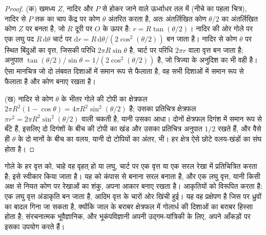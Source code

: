 \begin{proof}
(क) खमध्य $Z$, नादिर और $P$ से होकर जाने वाले ऊर्ध्वाधर तल में
(नीचे का पहला चित्र), नादिर से $P$ तक का चाप
केंद्र पर कोण $\theta$ अंतरित करता है, अतः अंतर्लिखित कोण
$\theta/2$ का अंतर्लिखित कोण $Z$ पर बनता है, जो $R$ दूरी पर $O$ के ऊपर है: $r =
R\tan(\theta/2)$। नादिर की ओर गोले पर एक लघु पद $R\,\mathrm d\theta$
चार्ट पर $\mathrm dr = R\,\mathrm d\theta/(2\cos^2(\theta/2))$ बन जाता है।
नादिर से कोण $\theta$ पर स्थित बिंदुओं का वृत्त, जिसकी परिधि $2\pi R\sin\theta$ है,
चार्ट पर परिधि $2\pi
r$ वाला वृत्त बन जाता है; अनुपात $\tan(\theta/2)/\sin\theta = 1/(2\cos^2(\theta/2))$ है,
जो त्रिज्या के अनुदिश का भी वही है। ऐसा मानचित्र जो दो लंबवत दिशाओं में
समान रूप से फैलाता है, वह सभी दिशाओं में समान रूप से फैलाता है और कोण बनाए रखता है।

(ख) नादिर से कोण $\theta$ के भीतर गोले की टोपी का क्षेत्रफल
$2\pi R^2(1 - \cos\theta) = 4\pi R^2\sin^2(\theta/2)$ है; उसका प्रतिचित्र
क्षेत्रफल $\pi r^2 = 2\pi R^2\sin^2(\theta/2)$ वाली चकती है, यानी उसका आधा। दोनों क्षेत्रफल
दिगंश में समान रूप से बँटे हैं, इसलिए दो दिगंशों के बीच की टोपी का खंड
और उसका प्रतिचित्र अनुपात $1/2$ रखते हैं, और वैसे ही
$\theta$ के दो मानों के बीच का वलय, यानी दो टोपियों का अंतर, भी। हर क्षेत्र ऐसे
छोटे वलय-खंडों का संघ होता है।
\end{proof}

 गोले के हर वृत्त को, चाहे वह वृहत् हो या लघु,
चार्ट पर एक वृत्त या एक सरल रेखा में प्रतिचित्रित करता है; इसे स्वीकार किया जाता है। यह
 को कंपास से बनाना सरल बनाता है, और एक लघु वृत्त, यानी
किसी अक्ष से नियत कोण पर रेखाओं का शंकु, अपना आकार बनाए रखता है।
 आकृतियों को विरूपित करता है: एक लघु वृत्त अंडाकृति बन जाता है,
आदिम वृत्त के चारों ओर खिंची हुई। यह वह प्रक्षेपण है जिस पर ध्रुवों का बादल
गिना जा सकता है, क्योंकि जाल के बराबर क्षेत्रफल में गोलार्ध की दिशाओं का बराबर
हिस्सा होता है; संरचनात्मक भूवैज्ञानिक, और भूकंपविज्ञानी अपनी उद्गम-यांत्रिकी के लिए,
अपने आँकड़ों पर इसका उपयोग करते हैं।

